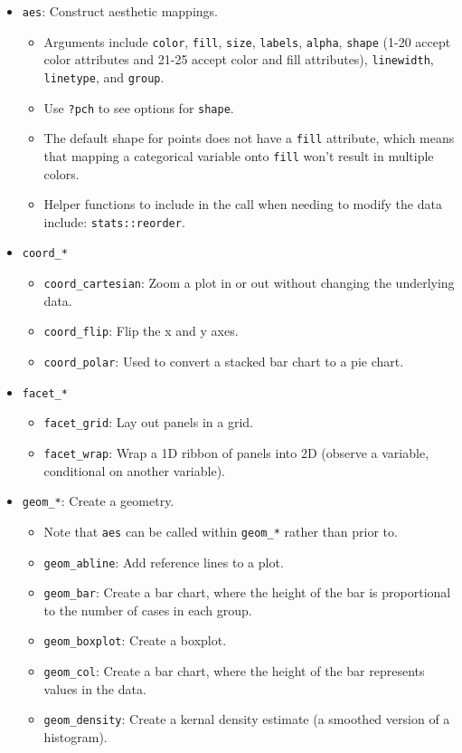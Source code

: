\documentclass[]{book}
\providecommand{\tightlist}{%
  \setlength{\itemsep}{0pt}\setlength{\parskip}{0pt}}
\begin{document}
\begin{itemize}
\tightlist
\item
  \texttt{aes}: Construct aesthetic mappings.

  \begin{itemize}
  \tightlist
  \item
    Arguments include \texttt{color}, \texttt{fill}, \texttt{size}, \texttt{labels}, \texttt{alpha}, \texttt{shape} (1-20 accept color attributes and 21-25 accept color and fill attributes), \texttt{linewidth}, \texttt{linetype}, and \texttt{group}.
  \item
    Use \texttt{?pch} to see options for \texttt{shape}.
  \item
    The default shape for points does not have a \texttt{fill} attribute, which means that mapping a categorical variable onto \texttt{fill} won't result in multiple colors.
  \item
    Helper functions to include in the call when needing to modify the data include: \texttt{stats::reorder}.
  \end{itemize}
\item
  \texttt{coord\_*}

  \begin{itemize}
  \tightlist
  \item
    \texttt{coord\_cartesian}: Zoom a plot in or out without changing the underlying data.
  \item
    \texttt{coord\_flip}: Flip the x and y axes.
  \item
    \texttt{coord\_polar}: Used to convert a stacked bar chart to a pie chart.
  \end{itemize}
\item
  \texttt{facet\_*}

  \begin{itemize}
  \tightlist
  \item
    \texttt{facet\_grid}: Lay out panels in a grid.
  \item
    \texttt{facet\_wrap}: Wrap a 1D ribbon of panels into 2D (observe a variable, conditional on another variable).
  \end{itemize}
\item
  \texttt{geom\_*}: Create a geometry.

  \begin{itemize}
  \tightlist
  \item
    Note that \texttt{aes} can be called within \texttt{geom\_*} rather than prior to.
  \item
    \texttt{geom\_abline}: Add reference lines to a plot.
  \item
    \texttt{geom\_bar}: Create a bar chart, where the height of the bar is proportional to the number of cases in each group.
  \item
    \texttt{geom\_boxplot}: Create a boxplot.
  \item
    \texttt{geom\_col}: Create a bar chart, where the height of the bar represents values in the data.
  \item
    \texttt{geom\_density}: Create a kernal density estimate (a smoothed version of a histogram).


\end{itemize}
\end{itemize}
\end{document}
